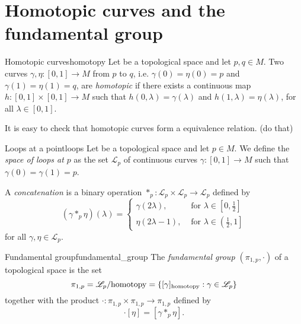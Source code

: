 \section{Homotopic curves and the fundamental group}

\begin{definition}{Homotopic curves}{homotopy}
    Let  be a topological space and let \(p, q \in M\). Two curves \(\gamma,\eta: [0,1]\to M\) from \(p\) to \(q\), i.e. \(\gamma(0) = \eta(0) = p\) and \(\gamma(1) = \eta(1) = q\), are \emph{homotopic} if there exists a continuous map \(h : [0,1] \times [0,1] \to M\) such that \(h(0, \lambda) = \gamma(\lambda)\) and \(h(1, \lambda) = \eta(\lambda)\), for all \(\lambda \in [0,1]\).
\end{definition}

It is easy to check that homotopic curves form a equivalence relation. (do that)

\begin{definition}{Loops at a point}{loops}
    Let  be a topological space and let \(p \in M\). We define the \emph{space of loops at \(p\)} as the set \(\mathscr{L}_p\) of continuous curves \(\gamma : [0,1] \to M\) such that \(\gamma(0) = \gamma(1) = p\).

    A \emph{concatenation} is a binary operation \(\ast_p : \mathscr{L}_p \times \mathscr{L}_p \to \mathscr{L}_p\) defined by
    \begin{equation*}
        (\gamma \ast_p \eta)(\lambda) = \begin{cases}\gamma(2\lambda), & \text{ for } \lambda \in \left[0,\frac12\right]\\\eta(2\lambda -1), &\text{ for }\lambda \in \left(\frac12, 1\right]\end{cases}
    \end{equation*}
    for all \(\gamma,\eta \in \mathscr{L}_p\).
\end{definition}

\begin{definition}{Fundamental group}{fundamental_group}
    The \emph{fundamental group \((\pi_{1,p}, \cdot)\)} of a topological space is the set
    \begin{equation*}
        \pi_{1,p} = \mathscr{L}_p / \mathrm{homotopy} = \{[\gamma]_{\mathrm{homotopy}} : \gamma \in \mathscr{L}_p\}
    \end{equation*}
    together with the product \(\cdot : \pi_{1,p} \times \pi_{1,p} \to \pi_{1,p}\) defined by
    \begin{equation*}
        [\gamma] \cdot [\eta] = [\gamma \ast_p \eta].
    \end{equation*}
\end{definition}

